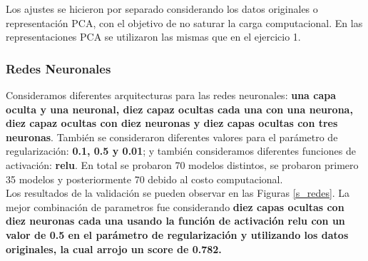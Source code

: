 \documentclass[paper=letter, fontsize=11pt]{scrartcl}
\numberwithin{equation}{section} %
\numberwithin{figure}{section} %
\numberwithin{table}{section} %
\begin{document}
Los ajustes se hicieron por separado considerando los datos originales o representación PCA, con el objetivo de no saturar la carga computacional. En las representaciones PCA se utilizaron las mismas que en el ejercicio 1.

\subsubsection*{Redes Neuronales}
Consideramos diferentes arquitecturas para las redes neuronales: \textbf{una capa oculta y una neuronal, diez capaz ocultas cada una con una neurona, diez capaz ocultas con diez neuronas y diez capas ocultas con tres neuronas}. También se consideraron diferentes valores para el parámetro de regularización: \textbf{0.1, 0.5 y 0.01}; y también consideramos diferentes funciones de activación: \textbf{relu}. En total se probaron 70 modelos distintos, se probaron primero 35 modelos y posteriormente 70 debido al costo computacional.\\

Los resultados de la validación se pueden observar en las Figuras \ref{s_redes}. La mejor combinación de parametros fue considerando \textbf{diez capas ocultas con diez neuronas cada una usando la función de activación relu con un valor de 0.5 en el parámetro de regularización y utilizando los datos originales, la cual arrojo un score de 0.782.}
\end{document}
